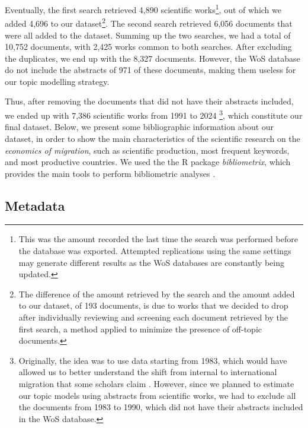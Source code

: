 Eventually, the first search retrieved 4,890 scientific works\footnote{This was the amount recorded the last time the search was performed before the database was exported. Attempted replications using the same settings may generate different results as the WoS databases are constantly being updated.}, out of which we added 4,696 to our dataset\footnote{The difference of the amount retrieved by the search and the amount added to our dataset, of 193 documents, is due to works that we decided to drop after individually reviewing and screening each document retrieved by the first search, a method applied to minimize the presence of off-topic documents.}. The second search retrieved 6,056 documents that were all added to the dataset. Summing up the two searches, we had a total of 10,752 documents, with 2,425 works common to both searches. After excluding the duplicates, we end up with the 8,327 documents. However, the WoS database do not include the abstracts of 971 of these documents, making them useless for our topic modelling strategy.

Thus, after removing the documents that did not have their abstracts included, we ended up with 7,386 scientific works from 1991 to 2024 \footnote{Originally, the idea was to use data starting from 1983, which would have allowed us to better understand the shift from internal to international migration that some scholars claim \citep{cushing_crossing_2004}. However, since we planned to estimate our topic models using abstracts from scientific works, we had to exclude all the documents from 1983 to 1990, which did not have their abstracts included in the WoS database.}, which constitute our final dataset. Below, we present some bibliographic information about our dataset, in order to show the main characteristics of the scientific research on the \textit{economics of migration}, such as scientific production, most frequent keywords, and most productive countries. We used the the R package \textit{bibliometrix}, which provides the main tools to perform bibliometric analyses \citep{aria_bibliometrix_2017}.

\subsection{Metadata} \label{metadata}


